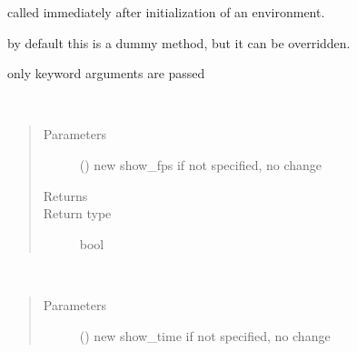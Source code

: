 \documentclass[letterpaper,10pt,english]{sphinxmanual}
\begin{document}
\begin{fulllineitems}
\begin{fulllineitems}
\begin{quote}
\begin{description}
\end{description}\end{quote}

\end{fulllineitems}


\begin{fulllineitems}
\label{\detokenize{Reference:salabim.Environment.setup}}
called immediately after initialization of an environment.

by default this is a dummy method, but it can be overridden.

only keyword arguments are passed

\end{fulllineitems}


\begin{fulllineitems}
\label{\detokenize{Reference:salabim.Environment.show_fps}}~\begin{quote}\begin{description}
\item[{Parameters}] \leavevmode
{} () \textendash{} new show\_fps 
if not specified, no change

\item[{Returns}] \leavevmode
{}

\item[{Return type}] \leavevmode
bool

\end{description}\end{quote}

\end{fulllineitems}


\begin{fulllineitems}
\label{\detokenize{Reference:salabim.Environment.show_time}}~\begin{quote}\begin{description}
\item[{Parameters}] \leavevmode
{} () \textendash{} new show\_time 
if not specified, no change


\end{description}
\end{quote}
\end{fulllineitems}
\end{fulllineitems}
\end{document}
